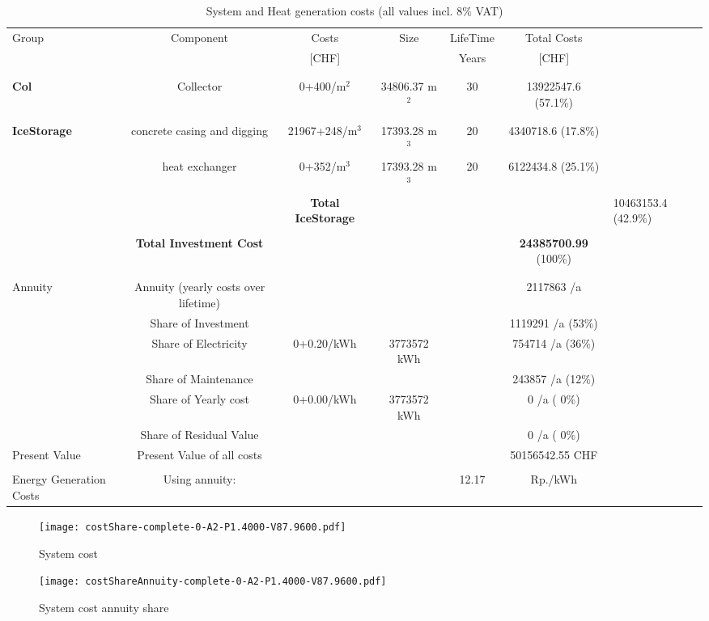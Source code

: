 \documentclass[english]{SPFShortReport}
\begin{document}
\begin{table}[!ht]
\centering
\caption{System and Heat generation costs (all values incl. 8$\%$ VAT) }
\begin{adjustbox}{max width =\textwidth}
\begin{tabular}{l | c c c c c } 
\hline
\hline
Group &Component &Costs &Size &LifeTime &Total Costs \\ 
 & &[CHF] & &Years &[CHF]\\ 
\hline
\\
\hline \\
\textbf{Col} & Collector & 0+400/m$^2$ & 34806.37 m$^2$ & 30 & 13922547.6 (57.1\%) \\
\hline \\
\hline \\
\textbf{IceStorage} & concrete casing and digging & 21967+248/m$^3$ & 17393.28 m$^3$ & 20 & 4340718.6 (17.8\%) \\
 & heat exchanger & 0+352/m$^3$ & 17393.28 m$^3$ & 20 & 6122434.8 (25.1\%) \\
&
 & \textbf{Total IceStorage} & & & & 10463153.4 (42.9\%) \\
\hline \\
 & \textbf{Total Investment Cost} & & & & \textbf{24385700.99} (100\%) \\ 
\hline \\ 
\hline \\ 
Annuity & Annuity (yearly costs over lifetime)  &&& & 2117863 /a  \\
 & Share of Investment & &&& 1119291 /a (53\%) \\
 & Share of Electricity & 0+0.20/kWh & 3773572 kWh &  & 754714 /a (36\%)\\
 & Share of Maintenance & &&& 243857 /a (12\%)\\ 
 & Share of Yearly cost & 0+0.00/kWh & 3773572 kWh & &  0 /a ( 0\%)\\
 & Share of Residual Value &&& &  0 /a ( 0\%)\\
Present Value  & Present Value of all costs  & &&& 50156542.55 CHF \\
\hline \\ 
 Energy Generation Costs & Using annuity: &&& 12.17 & Rp./kWh \\
\hline
\hline
\end{tabular}
\end{adjustbox}
\label{CostsTable}
\end{table}
\begin{figure}[!htbp]
\begin{center}
\texttt{[image: costShare-complete-0-A2-P1.4000-V87.9600.pdf]}
\caption{System cost}
\label{systemCost}
\end{center}
\end{figure}
\begin{figure}[!htbp]
\begin{center}
\texttt{[image: costShareAnnuity-complete-0-A2-P1.4000-V87.9600.pdf]}
\caption{System cost annuity share}
\label{systemCostannuity}
\end{center}
\end{figure}
\end{document}
